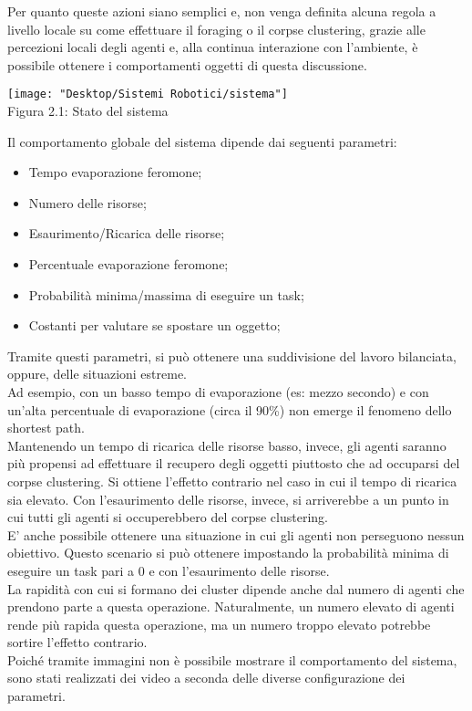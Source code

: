 \documentclass[12pt,a4paper,openright,twoside]{report}
\begin{document}
Per quanto queste azioni siano semplici e, non venga definita alcuna regola a livello locale su come effettuare il foraging o il corpse clustering, grazie alle percezioni locali degli agenti e, alla continua interazione con l'ambiente, è possibile ottenere i comportamenti oggetti di questa discussione.\\

\begin{center}  
	\texttt{[image: "Desktop/Sistemi Robotici/sistema"]}
	\\Figura 2.1: Stato del sistema
\end{center}


Il comportamento globale del sistema dipende dai seguenti parametri:\\

\begin{itemize}
	\item Tempo evaporazione feromone;
	\item Numero delle risorse;
	\item Esaurimento/Ricarica delle risorse;
	\item Percentuale evaporazione feromone;
	\item Probabilità minima/massima di eseguire un task;
	\item Costanti per valutare se spostare un oggetto;
\end{itemize}

Tramite questi parametri, si può ottenere una suddivisione del lavoro bilanciata, oppure, delle situazioni estreme.\\
Ad esempio, con un basso tempo di evaporazione (es: mezzo secondo) e con un'alta percentuale di evaporazione (circa il 90\%) non emerge il fenomeno dello shortest path.\\
Mantenendo un tempo di ricarica delle risorse basso, invece, gli agenti saranno più propensi ad effettuare il recupero degli oggetti piuttosto che ad occuparsi del corpse clustering. Si ottiene l'effetto contrario nel caso in cui il tempo di ricarica sia elevato. Con l'esaurimento delle risorse, invece, si arriverebbe a un punto in cui tutti gli agenti si occuperebbero del corpse clustering.\\
E' anche possibile ottenere una situazione in cui gli agenti non perseguono nessun obiettivo. Questo scenario si può ottenere impostando la probabilità minima di eseguire un task pari a 0 e con l'esaurimento delle risorse.\\
La rapidità con cui si formano dei cluster dipende anche dal numero di agenti che prendono parte a questa operazione. Naturalmente, un numero elevato di agenti rende più rapida questa operazione, ma un numero troppo elevato potrebbe sortire l'effetto contrario.\\
Poiché tramite immagini non è possibile mostrare il comportamento del sistema, sono stati realizzati dei video a seconda delle diverse configurazione dei parametri.
\end{document}
